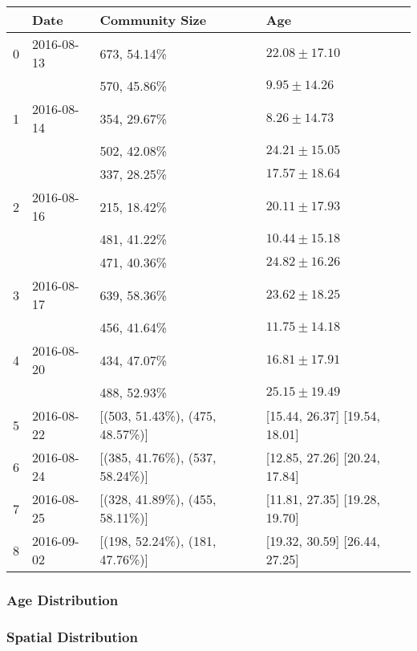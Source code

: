 \begin{table}
\begin{tabularx}{\textwidth}{llll}
	\toprule
	{} &               Date &    Community Size &                Age            \\
	\midrule
	0 &  2016-08-13 &			 673, 54.14\% &      $22.08 \pm17.10$  \\
	   &                       &			570, 45.86\% &         $9.95\pm14.26$  \\
	
	1 &  2016-08-14  &  			354, 29.67\%  &  $8.26 \pm 14.73$ \\
	   &						&          502, 42.08\%      &    $24.21 \pm 15.05$\\
	   &						&		   337, 28.25\%      &    $17.57 \pm 18.64$\\
	    
	2 &  2016-08-16  &	  		   215, 18.42\% &    $20.11 \pm 17.93$\\
	   &						&			 481, 41.22\%  &  $10.44 \pm 15.18$\\
	   &						&		  	 471, 40.36\%  & $24.82 \pm 16.26$\\
	   
	3 &  2016-08-17 &                    639, 58.36\%    &         $23.62 \pm 18.25$ \\
	   &                       & 					456, 41.64\%	&		$11.75 \pm 14.18$ \\
	   
	4 &  2016-08-20 &                 434, 47.07\%         &      $16.81 \pm 17.91$ \\
	   &                       & 					488, 52.93\%	  &     $25.15 \pm 19.49$ \\
	   							
	5 &  2016-08-22 &                 [(503, 51.43\%), (475, 48.57\%)] &         [15.44, 26.37]          [19.54, 18.01] \\
	6 &  2016-08-24 &                 [(385, 41.76\%), (537, 58.24\%)] &         [12.85, 27.26]          [20.24, 17.84] \\
	7 &  2016-08-25 &                 [(328, 41.89\%), (455, 58.11\%)] &         [11.81, 27.35]          [19.28, 19.70] \\
	8 &  2016-09-02 &                 [(198, 52.24\%), (181, 47.76\%)] &         [19.32, 30.59]          [26.44, 27.25] \\
	\bottomrule
\end{tabularx}
\end{table}


\subsubsection{Age Distribution}

\subsubsection{Spatial Distribution}
